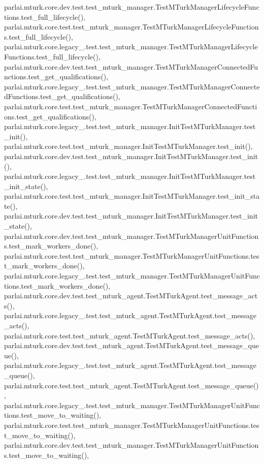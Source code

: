 parlai.\+mturk.\+core.\+dev.\+test.\+test\+\_\+mturk\+\_\+manager.\+Test\+M\+Turk\+Manager\+Lifecycle\+Functions.\+test\+\_\+full\+\_\+lifecycle(), parlai.\+mturk.\+core.\+test.\+test\+\_\+mturk\+\_\+manager.\+Test\+M\+Turk\+Manager\+Lifecycle\+Functions.\+test\+\_\+full\+\_\+lifecycle(), parlai.\+mturk.\+core.\+legacy\+\_.\+test.\+test\+\_\+mturk\+\_\+manager.\+Test\+M\+Turk\+Manager\+Lifecycle\+Functions.\+test\+\_\+full\+\_\+lifecycle(), parlai.\+mturk.\+core.\+dev.\+test.\+test\+\_\+mturk\+\_\+manager.\+Test\+M\+Turk\+Manager\+Connected\+Functions.\+test\+\_\+get\+\_\+qualifications(), parlai.\+mturk.\+core.\+legacy\+\_.\+test.\+test\+\_\+mturk\+\_\+manager.\+Test\+M\+Turk\+Manager\+Connected\+Functions.\+test\+\_\+get\+\_\+qualifications(), parlai.\+mturk.\+core.\+test.\+test\+\_\+mturk\+\_\+manager.\+Test\+M\+Turk\+Manager\+Connected\+Functions.\+test\+\_\+get\+\_\+qualifications(), parlai.\+mturk.\+core.\+legacy\+\_.\+test.\+test\+\_\+mturk\+\_\+manager.\+Init\+Test\+M\+Turk\+Manager.\+test\+\_\+init(), parlai.\+mturk.\+core.\+test.\+test\+\_\+mturk\+\_\+manager.\+Init\+Test\+M\+Turk\+Manager.\+test\+\_\+init(), parlai.\+mturk.\+core.\+dev.\+test.\+test\+\_\+mturk\+\_\+manager.\+Init\+Test\+M\+Turk\+Manager.\+test\+\_\+init(), parlai.\+mturk.\+core.\+legacy\+\_.\+test.\+test\+\_\+mturk\+\_\+manager.\+Init\+Test\+M\+Turk\+Manager.\+test\+\_\+init\+\_\+state(), parlai.\+mturk.\+core.\+test.\+test\+\_\+mturk\+\_\+manager.\+Init\+Test\+M\+Turk\+Manager.\+test\+\_\+init\+\_\+state(), parlai.\+mturk.\+core.\+dev.\+test.\+test\+\_\+mturk\+\_\+manager.\+Init\+Test\+M\+Turk\+Manager.\+test\+\_\+init\+\_\+state(), parlai.\+mturk.\+core.\+dev.\+test.\+test\+\_\+mturk\+\_\+manager.\+Test\+M\+Turk\+Manager\+Unit\+Functions.\+test\+\_\+mark\+\_\+workers\+\_\+done(), parlai.\+mturk.\+core.\+test.\+test\+\_\+mturk\+\_\+manager.\+Test\+M\+Turk\+Manager\+Unit\+Functions.\+test\+\_\+mark\+\_\+workers\+\_\+done(), parlai.\+mturk.\+core.\+legacy\+\_.\+test.\+test\+\_\+mturk\+\_\+manager.\+Test\+M\+Turk\+Manager\+Unit\+Functions.\+test\+\_\+mark\+\_\+workers\+\_\+done(), parlai.\+mturk.\+core.\+dev.\+test.\+test\+\_\+mturk\+\_\+agent.\+Test\+M\+Turk\+Agent.\+test\+\_\+message\+\_\+acts(), parlai.\+mturk.\+core.\+legacy\+\_.\+test.\+test\+\_\+mturk\+\_\+agent.\+Test\+M\+Turk\+Agent.\+test\+\_\+message\+\_\+acts(), parlai.\+mturk.\+core.\+test.\+test\+\_\+mturk\+\_\+agent.\+Test\+M\+Turk\+Agent.\+test\+\_\+message\+\_\+acts(), parlai.\+mturk.\+core.\+dev.\+test.\+test\+\_\+mturk\+\_\+agent.\+Test\+M\+Turk\+Agent.\+test\+\_\+message\+\_\+queue(), parlai.\+mturk.\+core.\+legacy\+\_.\+test.\+test\+\_\+mturk\+\_\+agent.\+Test\+M\+Turk\+Agent.\+test\+\_\+message\+\_\+queue(), parlai.\+mturk.\+core.\+test.\+test\+\_\+mturk\+\_\+agent.\+Test\+M\+Turk\+Agent.\+test\+\_\+message\+\_\+queue(), parlai.\+mturk.\+core.\+legacy\+\_.\+test.\+test\+\_\+mturk\+\_\+manager.\+Test\+M\+Turk\+Manager\+Unit\+Functions.\+test\+\_\+move\+\_\+to\+\_\+waiting(), parlai.\+mturk.\+core.\+test.\+test\+\_\+mturk\+\_\+manager.\+Test\+M\+Turk\+Manager\+Unit\+Functions.\+test\+\_\+move\+\_\+to\+\_\+waiting(), parlai.\+mturk.\+core.\+dev.\+test.\+test\+\_\+mturk\+\_\+manager.\+Test\+M\+Turk\+Manager\+Unit\+Functions.\+test\+\_\+move\+\_\+to\+\_\+waiting(), 